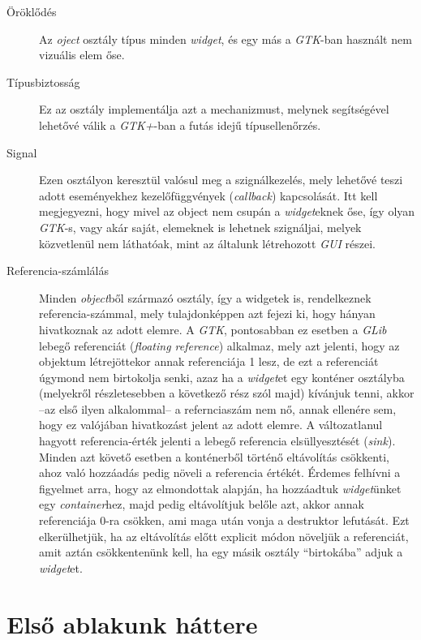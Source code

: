 \documentclass[a4paper,10pt]{article}
\begin{document}
\begin{description}
 \item[Öröklődés] Az \textit{oject} osztály típus minden \textit{widget}, és egy más a \textit{GTK}-ban használt nem vizuális elem őse.

 \item[Típusbiztosság] Ez az osztály implementálja azt a mechanizmust, melynek segítségével lehetővé válik a \textit{GTK+}-ban a futás idejű típusellenőrzés.

 \item[Signal] Ezen osztályon keresztül valósul meg a szignálkezelés, mely lehetővé teszi adott eseményekhez kezelőfüggvények (\textit{callback}) kapcsolását. Itt kell megjegyezni, hogy mivel az object nem csupán a \textit{widget}eknek őse, így olyan \textit{GTK}-s, vagy akár saját, elemeknek is lehetnek szignáljai, melyek közvetlenül nem láthatóak, mint az általunk létrehozott \textit{GUI} részei.

 \item[Referencia-számlálás] Minden \textit{object}ből származó osztály, így a widgetek is, rendelkeznek referencia-számmal, mely tulajdonképpen azt fejezi ki, hogy hányan hivatkoznak az adott elemre. A \textit{GTK}, pontosabban ez esetben a \textit{GLib} lebegő referenciát (\textit{floating reference}) alkalmaz, mely azt jelenti, hogy az objektum létrejöttekor annak referenciája 1 lesz, de ezt a referenciát úgymond nem birtokolja senki, azaz ha a \textit{widget}et egy konténer osztályba (melyekről részletesebben a következő rész szól majd) kívánjuk tenni, akkor --az első ilyen alkalommal-- a refernciaszám nem nő, annak ellenére sem, hogy ez valójában hivatkozást jelent az adott elemre. A változatlanul hagyott referencia-érték jelenti a lebegő referencia elsüllyesztését (\textit{sink}). Minden azt követő esetben a konténerből történő eltávolítás csökkenti, ahoz való hozzáadás pedig növeli a referencia értékét. Érdemes felhívni a figyelmet arra, hogy az elmondottak alapján, ha hozzáadtuk \textit{widget}ünket egy \textit{container}hez, majd pedig eltávolítjuk belőle azt, akkor annak referenciája 0-ra csökken, ami maga után vonja a destruktor lefutását. Ezt elkerülhetjük, ha az eltávolítás előtt explicit módon növeljük a referenciát, amit aztán csökkentenünk kell, ha egy másik osztály ``birtokába'' adjuk a \textit{widget}et.
\end{description}

\section{Első ablakunk háttere}
\end{document}
